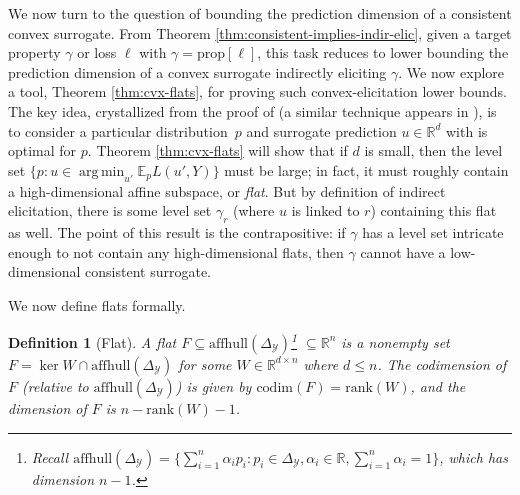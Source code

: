 \documentclass{article}
\newcommand{\Comments}{1}
\newcommand{\mytodo}[2]{\ifnum\Comments=1%
	\todo[linecolor=#1!80!black,backgroundcolor=#1,bordercolor=#1!80!black]{#2}\fi}
\newcommand{\jessiet}[1]{\mytodo{purple!20!white}{JF: #1}}
\newcommand{\reals}{\mathbb{R}}
\newcommand{\simplex}{\Delta_\Y}
\newcommand{\prop}[1]{\mathrm{prop}[#1]}
\newcommand{\codim}{\mathrm{codim}}
\newcommand{\affhull}{\mathrm{affhull}}
\newcommand{\E}{\mathbb{E}}
\newcommand{\Y}{\mathcal{Y}}
\newcommand{\exploss}[3]{\E_{#3} #1(#2,Y)}
\newtheorem{definition}{Definition}
\DeclareMathOperator*{\argmin}{arg\,min}
\begin{document}
We now turn to the question of bounding the prediction dimension of a consistent convex surrogate.
From Theorem \ref{thm:consistent-implies-indir-elic}, given a target property $\gamma$ or loss $\ell$ with $\gamma = \prop{\ell}$, this task reduces to lower bounding the prediction dimension of a convex surrogate indirectly eliciting $\gamma$.
We now explore a tool, Theorem \ref{thm:cvx-flats}, for proving such convex-elicitation lower bounds.
The key idea, crystallized from the proof of \citet[Theorem 16]{ramaswamy2016convex} (a similar technique appears in \citet[Theorem 9]{agarwal2015consistent}), is to consider a particular distribution~$p$ and surrogate prediction $u \in \reals^d$ with is optimal for $p$.
Theorem \ref{thm:cvx-flats} will show that if $d$ is small, then the level set $\{p : u \in \argmin_{u'} \exploss{L}{u'}{p}\}$ must be large; in fact, it must roughly contain a high-dimensional affine subspace, or \emph{flat}.
But by definition of indirect elicitation, there is some level set $\gamma_r$ (where $u$ is linked to $r$) containing this flat as well.
The point of this result is the contrapositive: if $\gamma$ has a level set intricate enough to not contain any high-dimensional flats, then $\gamma$ cannot have a low-dimensional consistent surrogate.

We now define flats formally.
\begin{definition}[Flat]\label{def:flat}
	A \emph{flat} $F \subseteq \affhull(\simplex)$\footnote{Recall $\affhull(\simplex) = \{\sum_{i=1}^n \alpha_i p_i : p_i \in \simplex, \alpha_i \in \reals, \sum_{i=1}^n \alpha_i = 1\}$, which has dimension $n-1$.} $\subseteq \reals^n$ is a nonempty set $F = \ker W \cap \affhull(\simplex)$ for some $W\in\reals^{d\times n}$ where $d\leq n$.
	The codimension of $F$ (relative to $\affhull(\simplex)$) is given by $\codim(F)=\mathrm{rank}(W)$, and the dimension of $F$ is $n - \mathrm{rank}(W) - 1$.
\end{definition}
\end{document}
